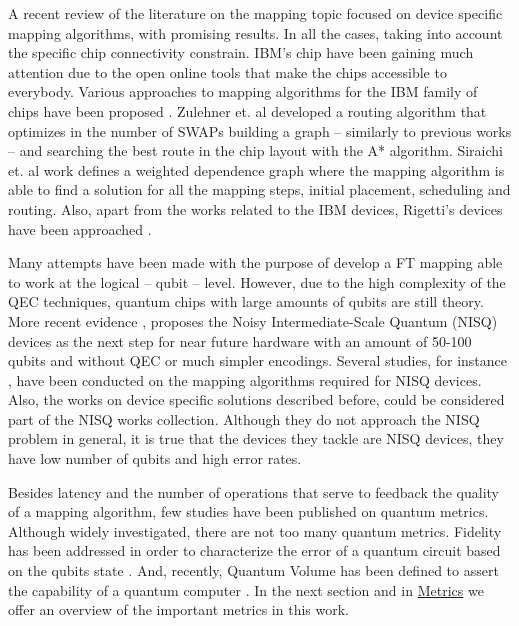 A recent review of the literature on the mapping topic focused on device specific mapping algorithms, with promising results.
In all the cases, taking into account the specific chip connectivity constrain.
IBM's chip have been gaining much attention due to the open online tools that make the chips accessible to everybody.
Various approaches to mapping algorithms for the IBM family of chips have been proposed \cite{zulehner17:effic_method_mappin_quant_circuit,Siraichi_2018,mckay18:qiskit_backen_specif_openq_openp_exper,Dueck_2018}.
Zulehner et. al \cite{zulehner17:effic_method_mappin_quant_circuit} developed a routing algorithm that optimizes in the number of SWAPs building a graph -- similarly to previous works --  and searching the best route in the chip layout with the A* algorithm.
Siraichi et. al \cite{Siraichi_2018} work defines a weighted dependence graph where the mapping algorithm is able to find a solution for all the mapping steps, initial placement, scheduling and routing.
Also, apart from the works related to the IBM devices, Rigetti's devices have been approached \cite{Venturelli_2018}.

Many attempts have been made \cite{Dousti_2014,Heckey_2015,hwang18:hierar_system_mappin_large_scale,murphy18:contr,Lao_2018} with the purpose of develop a FT mapping able to work at the logical -- qubit -- level.
However, due to the high complexity of the QEC techniques, quantum chips with large amounts of qubits are still theory.
More recent evidence \cite{Preskill_2018}, proposes the Noisy Intermediate-Scale Quantum (NISQ) devices as the next step for near future hardware with an amount of 50-100 qubits and without QEC or much simpler encodings.
Several studies, for instance \cite{tannu18:case_variab_aware_polic_nisq,paler18:nisq,paler18:influen_initial_qubit_placem_durin}, have been conducted on the mapping algorithms required for NISQ devices.
Also, the works on device specific solutions \cite{zulehner17:effic_method_mappin_quant_circuit,Siraichi_2018,mckay18:qiskit_backen_specif_openq_openp_exper,Dueck_2018,Venturelli_2018} described before, could be considered part of the NISQ works collection.
Although they do not approach the NISQ problem in general, it is true that the devices they tackle are NISQ devices, they have low number of qubits and high error rates.

Besides latency and the number of operations that serve to feedback the quality of a mapping algorithm, few studies have been published on quantum metrics.
Although widely investigated, there are not too many quantum metrics.
Fidelity has been addressed in order to characterize the error of a quantum circuit based on the qubits state \cite{Jozsa_1994,Nielsen_2009}.
And, recently, Quantum Volume has been defined to assert the capability of a quantum computer \cite{Moll_2018}.
In the next section and in \href{chapter-3.org}{Metrics} we offer an overview of the important metrics in this work.

